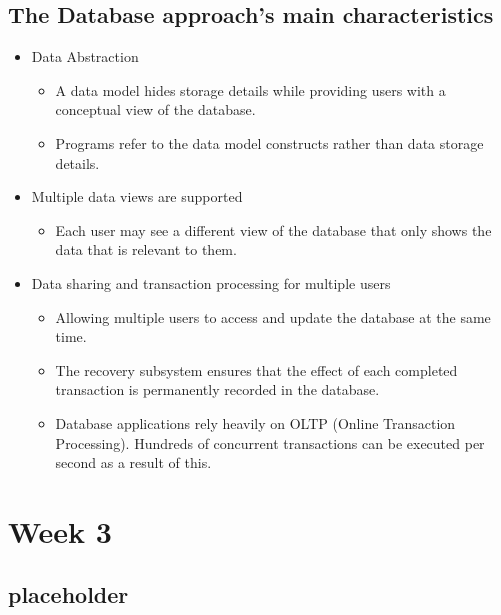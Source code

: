 \documentclass[a4paper, 12pt]{article}
\begin{document}
    \subsection{The Database approach's main characteristics}
    \begin{itemize}
        \item Data Abstraction
            \begin{itemize}
                \item A data model hides storage details while providing users with a conceptual view of the database.
                \item Programs refer to the data model constructs rather than data storage details.
            \end{itemize}
        \item Multiple data views are supported
            \begin{itemize}
                \item Each user may see a different view of the database that only shows the data that is relevant to them.
            \end{itemize}
        \item Data sharing and transaction processing for multiple users
            \begin{itemize}
                \item Allowing multiple users to access and update the database at the same time.
                \item The recovery subsystem ensures that the effect of each completed transaction is permanently recorded in the database.
                \item Database applications rely heavily on OLTP (Online Transaction Processing). 
                Hundreds of concurrent transactions can be executed per second as a result of this.                
            \end{itemize}
    \end{itemize}

\newpage
\section{Week 3}
    \subsection{placeholder}

    
\end{document}
